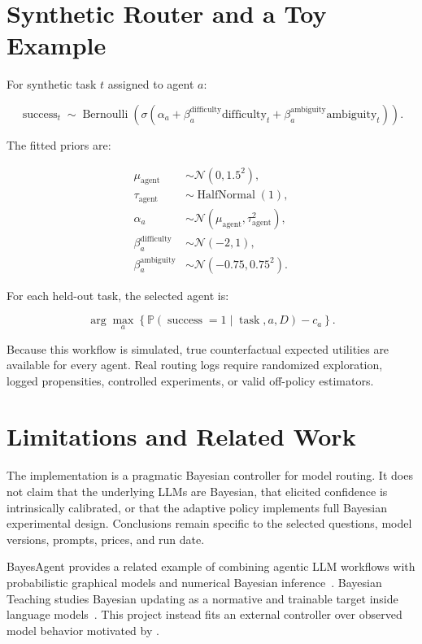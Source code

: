 \documentclass[11pt]{article}
\begin{document}
\section{Synthetic Router and a Toy Example}

For synthetic task $t$ assigned to agent $a$:

\begin{equation*}
\operatorname{success}_t
\sim
\operatorname{Bernoulli}
\left(
\sigma\left(
\alpha_a
+\beta_a^{\mathrm{difficulty}}\mathrm{difficulty}_t
+\beta_a^{\mathrm{ambiguity}}\mathrm{ambiguity}_t
\right)
\right).
\end{equation*}

The fitted priors are:

\begin{equation*}
\begin{aligned}
\mu_{\mathrm{agent}} &\sim\mathcal{N}(0,1.5^2), \\
\tau_{\mathrm{agent}} &\sim\operatorname{HalfNormal}(1), \\
\alpha_a &\sim\mathcal{N}(\mu_{\mathrm{agent}},\tau_{\mathrm{agent}}^2), \\
\beta_a^{\mathrm{difficulty}} &\sim\mathcal{N}(-2,1), \\
\beta_a^{\mathrm{ambiguity}} &\sim\mathcal{N}(-0.75,0.75^2).
\end{aligned}
\end{equation*}

For each held-out task, the selected agent is:

\begin{equation*}
\arg\max_a
\left\{
\mathbb{P}(\operatorname{success}=1\mid\operatorname{task},a,D)-c_a
\right\}.
\end{equation*}

Because this workflow is simulated, true counterfactual expected utilities are available for every agent. Real routing logs require randomized exploration, logged propensities, controlled experiments, or valid off-policy estimators.

\section{Limitations and Related Work}

The implementation is a pragmatic Bayesian controller for model routing. 
It does not claim that the underlying LLMs are Bayesian, that elicited confidence is intrinsically calibrated, or that the adaptive policy implements full Bayesian experimental design.
Conclusions remain specific to the selected questions, model versions, prompts, prices, and run date. 

BayesAgent provides a related example of combining agentic LLM workflows with probabilistic graphical models and numerical Bayesian inference~\citep{huang2026bayesagent}. Bayesian Teaching studies Bayesian updating as a normative and trainable target inside language models~\citep{qiu2025bayesianteaching}. 
This project instead fits an external controller over observed model behavior motivated by \cite{papamarkou2026bayesconsistent}.



\end{document}
